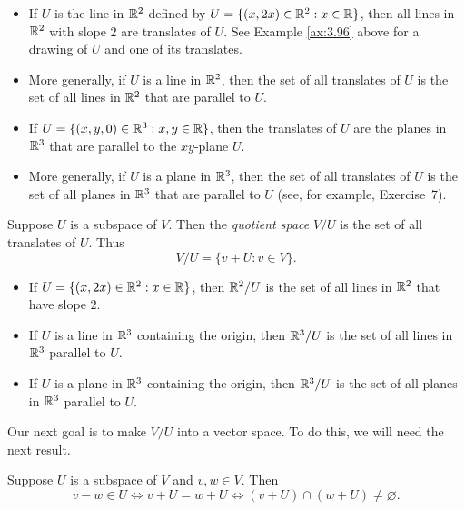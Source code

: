 \begin{example}[Translates]\label{ax:3.98}\leavevmode
\begin{itemize}
\item If $U$ is the line in $\mathbb{R}^2$ defined by $U=\{(x,2x)\in\mathbb{R}^2 : x\in\mathbb{R}\}$,
  then all lines in $\mathbb{R}^2$ with slope $2$ are translates of $U$. See Example
  \ref{ax:3.96} above for a drawing of $U$ and one of its translates.
\item More generally, if $U$ is a line in $\mathbb{R}^2$, then the set of all
  translates of $U$ is the set of all lines in $\mathbb{R}^2$ that are parallel to $U$.
\item If $U=\{(x,y,0)\in\mathbb{R}^3 : x,y\in\mathbb{R}\}$, then the translates of $U$ are the
  planes in $\mathbb{R}^3$ that are parallel to the $xy$-plane $U$.
\item More generally, if $U$ is a plane in $\mathbb{R}^3$, then the set of all
  translates of $U$ is the set of all planes in $\mathbb{R}^3$ that are parallel to $U$
  (see, for example, Exercise~7).
\end{itemize}
\end{example}

\begin{definition}\label{ax:3.99}
Suppose $U$ is a subspace of $V$. Then the \emph{quotient space} $V/U$ is the
set of all translates of $U$. Thus
\[ V/U = \{v+U : v\in V\}. \]
\end{definition}

\begin{example}\label{ax:3.100}\leavevmode
\begin{itemize}
\item If $U=\{(x,2x)\in\mathbb{R}^2 : x\in\mathbb{R}\}$, then $\mathbb{R}^2/U$ is the set of all lines
  in $\mathbb{R}^2$ that have slope $2$.
\item If $U$ is a line in $\mathbb{R}^3$ containing the origin, then $\mathbb{R}^3/U$ is the set
  of all lines in $\mathbb{R}^3$ parallel to $U$.
\item If $U$ is a plane in $\mathbb{R}^3$ containing the origin, then $\mathbb{R}^3/U$ is the
  set of all planes in $\mathbb{R}^3$ parallel to $U$.
\end{itemize}
\end{example}

Our next goal is to make $V/U$ into a vector space. To do this, we will need
the next result.

\begin{result}\label{ax:3.101}
Suppose $U$ is a subspace of $V$ and $v,w\in V$. Then
\[ v-w\in U \iff v+U=w+U \iff (v+U)\cap(w+U)\ne\varnothing. \]
\end{result}

